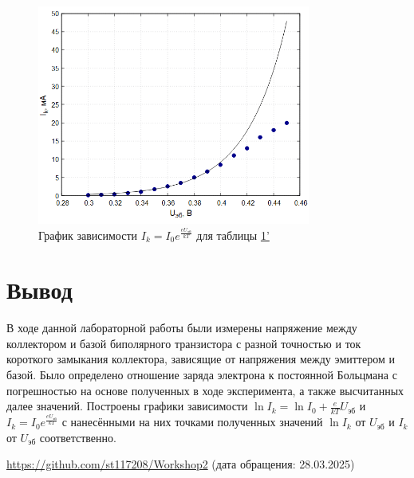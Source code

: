 \begin{figure}[H]
\centering
\includegraphics[width=0.8\textwidth]{Plot4.png}
\caption{График зависимости $I_k = I_0e^{\frac{eU_{\text{эб}}}{kT}}$ для таблицы \hyperref[tabl:2]{1'}}
\label{fig:plot4}
\end{figure}

\section{Вывод}
В ходе данной лабораторной работы были измерены напряжение между коллектором и базой биполярного транзистора с разной точностью и ток короткого замыкания коллектора, зависящие от напряжения между эмиттером и базой. Было определено отношение заряда электрона к постоянной Больцмана с погрешностью на основе полученных в ходе эксперимента, а также высчитанных далее значений. Построены графики зависимости $\ln I_k = \ln I_0 + \frac{e}{kT}U_{\text{эб}}$ и $I_k = I_0e^{\frac{eU_{\text{эб}}}{kT}}$ с нанесёнными на них точками полученных значений $\ln I_k$ от $U_{\text{эб}}$ и $I_k$ от $U_{\text{эб}}$ соответственно.

\begin{thebibliography}{9}
\url{https://github.com/st117208/Workshop2}  (дата обращения: 28.03.2025)
\end{thebibliography}